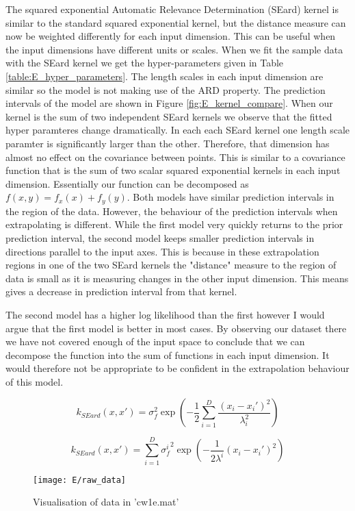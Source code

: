 \documentclass[11pt]{article}
\begin{document}
The squared exponential Automatic Relevance Determination (SEard) kernel is similar to the standard squared exponential kernel, but the distance measure can now be weighted differently for each input dimension. This can be useful when the input dimensions have different units or scales. When we fit the sample data with the SEard kernel we get the hyper-parameters given in Table \ref{table:E_hyper_parameters}. The length scales in each input dimension are similar so the model is not making use of the ARD property. The prediction intervals of the model are shown in Figure \ref{fig:E_kernel_compare}. When our kernel is the sum of two independent SEard kernels we observe that the fitted hyper paramteres change dramatically. In each each SEard kernel one length scale paramter is significantly larger than the other. Therefore, that dimension has almost no effect on the covariance between points. This is similar to a covariance function that is the sum of two scalar squared exponential kernels in each input dimension. Essentially our function can be decomposed as $f(x,y) = f_x(x) + f_y(y)$. Both models have similar prediction intervals in the region of the data. However, the behaviour of the prediction intervals when extrapolating is different. While the first model very quickly returns to the prior prediction interval, the second model keeps smaller prediction intervals in directions parallel to the input axes. This is because in these extrapolation regions in one of the two SEard kernels the "distance" measure to the region of data is small as it is measuring changes in the other input dimension. This means gives a decrease in prediction interval from that kernel. 

The second model has a higher log likelihood than the first however I would argue that the first model is better in most cases. By observing our dataset there we have not covered enough of the input space to conclude that we can decompose the function into the sum of functions in each input dimension. It would therefore not be appropriate to be confident in the extrapolation behaviour of this model.


\[k_{SEard}(x, x') = \sigma_f^2 \exp(-\frac{1}{2}\sum_{i=1}^{D} \frac{(x_i - x_i')^2}{\lambda_i^2})\]

\[k_{SEard}(x, x') = \sum_{i=1}^{D} {\sigma_f^i}^2 \exp(-\frac{1}{2 \lambda^i} (x_i - x_i')^2)\]

\begin{figure}[h]
    \centering
    \texttt{[image: E/raw\_data]}
    \caption{Visualisation of data in 'cw1e.mat'}
    \label{fig:E_data_vis}
\end{figure}
\end{document}
